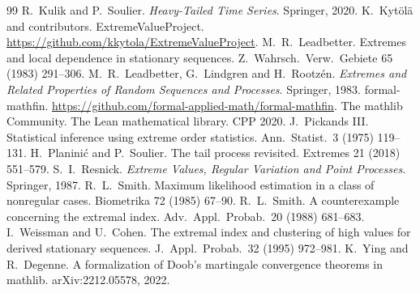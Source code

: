 \documentclass[11pt]{article}
\begin{document}
\begin{thebibliography}{99}
 R.~Kulik and P.~Soulier. \emph{Heavy-Tailed Time Series}. Springer, 2020.
 K.~Kytölä and contributors. ExtremeValueProject. \url{https://github.com/kkytola/ExtremeValueProject}.
 M.~R.~Leadbetter. Extremes and local dependence in stationary sequences. Z.\ Wahrsch.\ Verw.\ Gebiete 65 (1983) 291--306.
 M.~R.~Leadbetter, G.~Lindgren and H.~Rootz\'en. \emph{Extremes and Related Properties of Random Sequences and Processes}. Springer, 1983.
 formal-mathfin. \url{https://github.com/formal-applied-math/formal-mathfin}.
 The mathlib Community. The Lean mathematical library. CPP 2020.
 J.~Pickands III. Statistical inference using extreme order statistics. Ann.\ Statist.\ 3 (1975) 119--131.
 H.~Planini\'c and P.~Soulier. The tail process revisited. Extremes 21 (2018) 551--579.
 S.~I.~Resnick. \emph{Extreme Values, Regular Variation and Point Processes}. Springer, 1987.
 R.~L.~Smith. Maximum likelihood estimation in a class of nonregular cases. Biometrika 72 (1985) 67--90.
 R.~L.~Smith. A counterexample concerning the extremal index. Adv.\ Appl.\ Probab.\ 20 (1988) 681--683.
 I.~Weissman and U.~Cohen. The extremal index and clustering of high values for derived stationary sequences. J.\ Appl.\ Probab.\ 32 (1995) 972--981.
 K.~Ying and R.~Degenne. A formalization of Doob's martingale convergence theorems in mathlib. arXiv:2212.05578, 2022.
\end{thebibliography}
\end{document}
